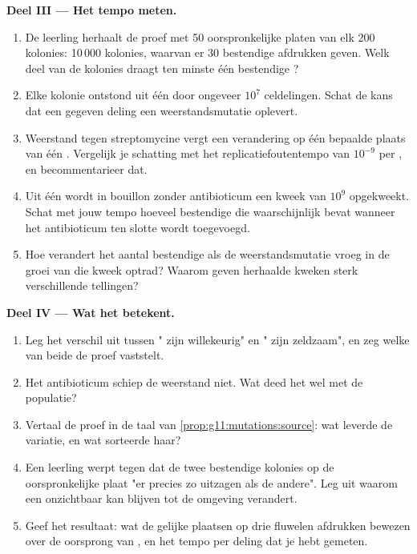 \begin{problem}
\medskip
\noindent\textbf{Deel III --- Het tempo meten.}
\begin{enumerate}[resume]
  \item De leerling herhaalt de proef met 50 oorspronkelijke platen van
        elk 200 kolonies: 10\,000 kolonies, waarvan er 30 bestendige
        afdrukken geven. Welk deel van de kolonies draagt ten minste één
        bestendige ?
  \item Elke kolonie ontstond uit één  door ongeveer $10^7$
        celdelingen. Schat de kans dat een gegeven deling een
        weerstandsmutatie oplevert.
  \item Weerstand tegen streptomycine vergt een verandering op één
        bepaalde plaats van één . Vergelijk je schatting met het
        replicatiefoutentempo van $10^{-9}$ per , en
        becommentarieer dat.
  \item Uit één  wordt in bouillon zonder antibioticum een kweek van
        $10^9$  opgekweekt. Schat met jouw tempo hoeveel bestendige
         die waarschijnlijk bevat wanneer het antibioticum ten
        slotte wordt toegevoegd.
  \item Hoe verandert het aantal bestendige  als de
        weerstandsmutatie vroeg in de groei van die kweek optrad? Waarom
        geven herhaalde kweken sterk verschillende tellingen?
\end{enumerate}

\medskip
\noindent\textbf{Deel IV --- Wat het betekent.}
\begin{enumerate}[resume]
  \item Leg het verschil uit tussen " zijn willekeurig" en
        " zijn zeldzaam", en zeg welke van beide de proef
        vaststelt.
  \item Het antibioticum schiep de weerstand niet. Wat deed het wel met
        de populatie?
  \item Vertaal de proef in de taal van
        \cref{prop:g11:mutations:source}: wat leverde de variatie, en wat
        sorteerde haar?
  \item Een leerling werpt tegen dat de twee bestendige kolonies op de
        oorspronkelijke plaat "er precies zo uitzagen als de andere". Leg
        uit waarom een  onzichtbaar kan blijven tot de omgeving
        verandert.
  \item Geef het resultaat: wat de gelijke plaatsen op drie fluwelen
        afdrukken bewezen over de oorsprong van , en het tempo
        per deling dat je hebt gemeten.
\end{enumerate}
\end{problem}
